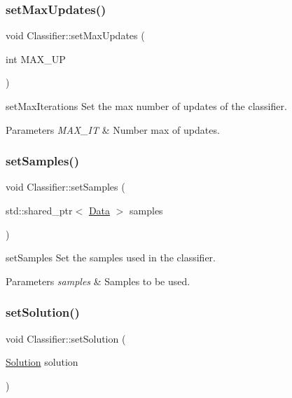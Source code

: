 \subsubsection{\texorpdfstring{set\+Max\+Updates()}{setMaxUpdates()}}
{\footnotesize\ttfamily void Classifier\+::set\+Max\+Updates (\begin{DoxyParamCaption}\item[{int}]{M\+A\+X\+\_\+\+UP }\end{DoxyParamCaption})}



set\+Max\+Iterations Set the max number of updates of the classifier. 


\begin{DoxyParams}{Parameters}
{\em M\+A\+X\+\_\+\+IT} & Number max of updates. \\
\hline
\end{DoxyParams}
\mbox{\label{class_classifier_a6cbc0189f7fcd1afe68096af8f24c58a}} 
\subsubsection{\texorpdfstring{set\+Samples()}{setSamples()}}
{\footnotesize\ttfamily void Classifier\+::set\+Samples (\begin{DoxyParamCaption}\item[{std\+::shared\+\_\+ptr$<$ \hyperlink{class_data}{Data} $>$}]{samples }\end{DoxyParamCaption})\hspace{0.3cm}{\ttfamily [virtual]}}



set\+Samples Set the samples used in the classifier. 


\begin{DoxyParams}{Parameters}
{\em samples} & Samples to be used. \\
\hline
\end{DoxyParams}
\mbox{\label{class_classifier_aef6cb633eed60712f8948a404f630e82}} 
\subsubsection{\texorpdfstring{set\+Solution()}{setSolution()}}
{\footnotesize\ttfamily void Classifier\+::set\+Solution (\begin{DoxyParamCaption}\item[{\hyperlink{class_solution}{Solution}}]{solution }\end{DoxyParamCaption})}



